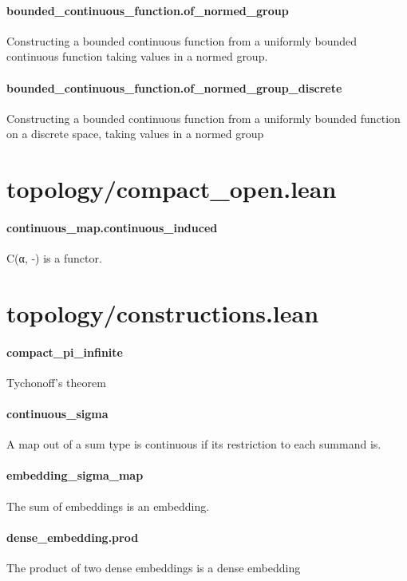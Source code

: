 \documentclass{article}
\begin{document}
\paragraph{bounded\_continuous\_function.of\_normed\_group}
\par
Constructing a bounded continuous function from a uniformly bounded continuous
function taking values in a normed group.
\paragraph{bounded\_continuous\_function.of\_normed\_group\_discrete}
\par
Constructing a bounded continuous function from a uniformly bounded
function on a discrete space, taking values in a normed group
\section{topology/compact\_open.lean}\paragraph{continuous\_map.continuous\_induced}
\par
C(α, -) is a functor.
\section{topology/constructions.lean}\paragraph{compact\_pi\_infinite}
\par
Tychonoff's theorem
\paragraph{continuous\_sigma}
\par
A map out of a sum type is continuous if its restriction to each summand is.
\paragraph{embedding\_sigma\_map}
\par
The sum of embeddings is an embedding.
\paragraph{dense\_embedding.prod}
\par
The product of two dense embeddings is a dense embedding
\end{document}
